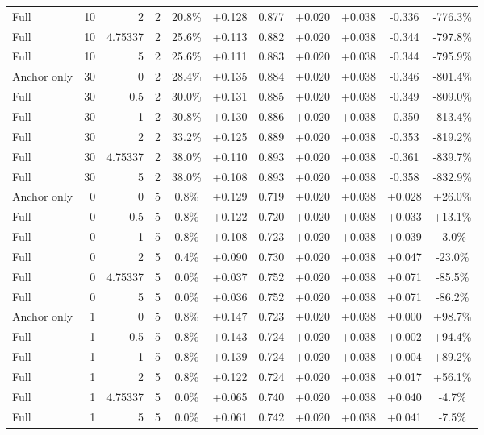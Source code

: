 \begin{table}[htbp]
\begin{tabular}{lrrrccccccc}
Full & 10 & 2 & 2 & 20.8\% & +0.128 & 0.877 & +0.020 & +0.038 & -0.336 & -776.3\% \\
Full & 10 & 4.75337 & 2 & 25.6\% & +0.113 & 0.882 & +0.020 & +0.038 & -0.344 & -797.8\% \\
Full & 10 & 5 & 2 & 25.6\% & +0.111 & 0.883 & +0.020 & +0.038 & -0.344 & -795.9\% \\
Anchor only & 30 & 0 & 2 & 28.4\% & +0.135 & 0.884 & +0.020 & +0.038 & -0.346 & -801.4\% \\
Full & 30 & 0.5 & 2 & 30.0\% & +0.131 & 0.885 & +0.020 & +0.038 & -0.349 & -809.0\% \\
Full & 30 & 1 & 2 & 30.8\% & +0.130 & 0.886 & +0.020 & +0.038 & -0.350 & -813.4\% \\
Full & 30 & 2 & 2 & 33.2\% & +0.125 & 0.889 & +0.020 & +0.038 & -0.353 & -819.2\% \\
Full & 30 & 4.75337 & 2 & 38.0\% & +0.110 & 0.893 & +0.020 & +0.038 & -0.361 & -839.7\% \\
Full & 30 & 5 & 2 & 38.0\% & +0.108 & 0.893 & +0.020 & +0.038 & -0.358 & -832.9\% \\
Anchor only & 0 & 0 & 5 & 0.8\% & +0.129 & 0.719 & +0.020 & +0.038 & +0.028 & +26.0\% \\
Full & 0 & 0.5 & 5 & 0.8\% & +0.122 & 0.720 & +0.020 & +0.038 & +0.033 & +13.1\% \\
Full & 0 & 1 & 5 & 0.8\% & +0.108 & 0.723 & +0.020 & +0.038 & +0.039 & -3.0\% \\
Full & 0 & 2 & 5 & 0.4\% & +0.090 & 0.730 & +0.020 & +0.038 & +0.047 & -23.0\% \\
Full & 0 & 4.75337 & 5 & 0.0\% & +0.037 & 0.752 & +0.020 & +0.038 & +0.071 & -85.5\% \\
Full & 0 & 5 & 5 & 0.0\% & +0.036 & 0.752 & +0.020 & +0.038 & +0.071 & -86.2\% \\
Anchor only & 1 & 0 & 5 & 0.8\% & +0.147 & 0.723 & +0.020 & +0.038 & +0.000 & +98.7\% \\
Full & 1 & 0.5 & 5 & 0.8\% & +0.143 & 0.724 & +0.020 & +0.038 & +0.002 & +94.4\% \\
Full & 1 & 1 & 5 & 0.8\% & +0.139 & 0.724 & +0.020 & +0.038 & +0.004 & +89.2\% \\
Full & 1 & 2 & 5 & 0.8\% & +0.122 & 0.724 & +0.020 & +0.038 & +0.017 & +56.1\% \\
Full & 1 & 4.75337 & 5 & 0.0\% & +0.065 & 0.740 & +0.020 & +0.038 & +0.040 & -4.7\% \\
Full & 1 & 5 & 5 & 0.0\% & +0.061 & 0.742 & +0.020 & +0.038 & +0.041 & -7.5\% \\

\end{tabular}
\end{table}
